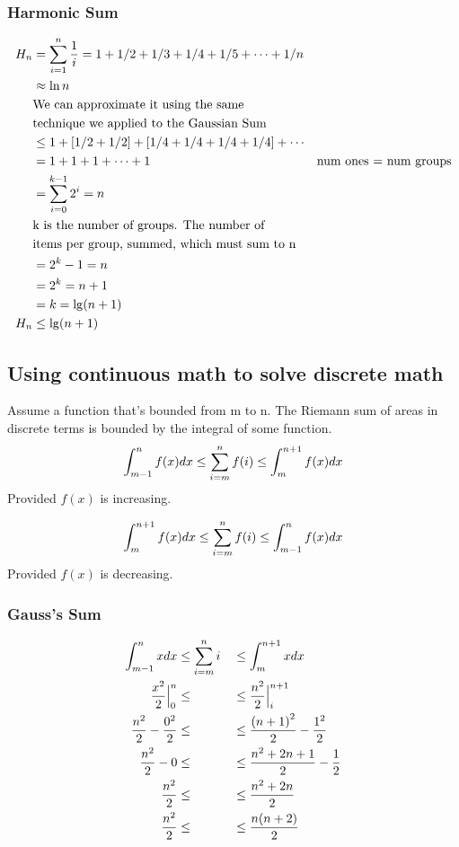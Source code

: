 \documentclass[english, 10pt]{article}
\begin{document}
\subsubsection{Harmonic Sum}
\begin{align*}
    H_n &= \sum_{i=1}^{n} \frac{1}{i} = 1+1/2 +1/3 + 1/4 + 1/5 + \cdots + 1/n \\
    &\approx \ln n \\
    &\text{We can approximate it using the same} \\
    &\text{technique we applied to the Gaussian Sum}\\
    &\le 1 + [1/2 + 1/2] + [1/4 + 1/4 + 1/4 + 1/4] + \cdots \\
    &= 1 + 1 + 1 + \cdots + 1 &\text{num ones = num  groups} \\
    &= \sum_{i=0}^{k-1} 2^i =n \\
    &\text{k is the number of groups. The number of} \\
    &\text{items per group, summed, which must sum to n} \\
    &= 2^k -1 =n \\
    &= 2^k = n+1 \\
    &= k= \lg (n+1) \\
    H_n &\le \lg (n+1) \\
\end{align*}

\subsection{Using continuous math to solve discrete math}

Assume a function that's bounded from m to n. The Riemann sum of areas in discrete terms is bounded by the integral of some function.
$$\int_{m-1}^n f(x) dx \le \sum_{i=m}^{n} f(i) \le \int_{m}^{n+1} f(x) dx$$ Provided $f(x)$ is increasing.

$$\int_{m}^{n+1} f(x) dx \le \sum_{i=m}^{n} f(i) \le \int_{m-1}^{n} f(x) dx$$ Provided $f(x)$ is decreasing.

\subsubsection{Gauss's Sum}
\begin{alignat*}{3}
    \int_{m-1}^n x dx            &\le \sum_{i=m}^{n} i &&\le \int_{m}^{n+1} x dx \\
    \frac{x^2}{2} \Big|_0^n      &\le              &&\le \frac{n^2}{2} \Big|_i^{n+1} \\
    \frac{n^2}{2} -\frac{0^2}{2} &\le              &&\le \frac{{(n+1)}^2}{2} -\frac{1^2}{2} \\
    \frac{n^2}{2}-0              &\le              &&\le \frac{n^2+2n+1}{2} -\frac{1}{2} \\
    \frac{n^2}{2}                &\le              &&\le \frac{n^2+2n}{2}  \\
    \frac{n^2}{2}                &\le              &&\le \frac{n(n+2)}{2}
\end{alignat*}
\end{document}
